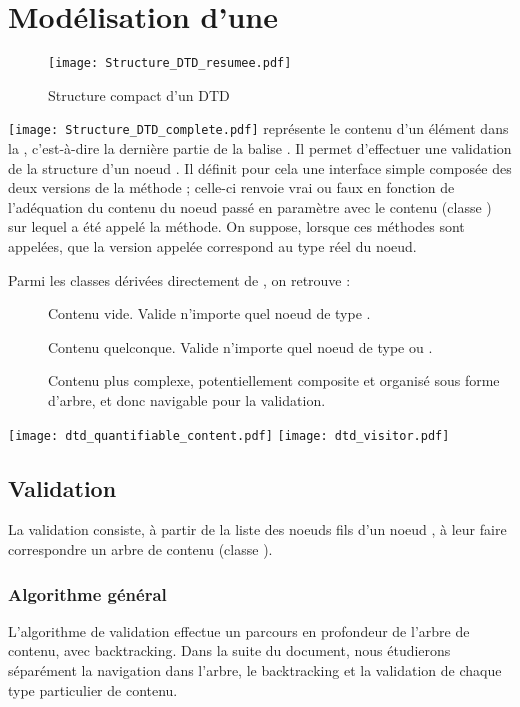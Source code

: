 \newcommand{\browseUp}{$self.browseUp(nextStep, firstNodeIterator, endNodeIterator)$\xspace}
\newcommand{\browseDown}{$self.browseDown(child, firstNodeIterator, endNodeIterator, self)$\xspace}

\section{Modélisation d'une \dtd}
\begin{figure}[H]
  \texttt{[image: Structure\_DTD\_resumee.pdf]}
  \caption{Structure compact d'un DTD}
\end{figure}
  \texttt{[image: Structure\_DTD\_complete.pdf]}
 représente le contenu d'un élément dans la \dtd, c'est-à-dire la dernière partie de la balise . Il permet d'effectuer une validation de la structure d'un noeud \xml. Il définit pour cela une interface simple composée des deux versions de la méthode  ; celle-ci renvoie vrai ou faux en fonction de l'adéquation du contenu du noeud passé en paramètre avec le contenu (classe ) sur lequel a été appelé la méthode. On suppose, lorsque ces méthodes sont appelées, que la version appelée correspond au type réel du noeud.

Parmi les classes dérivées directement de , on retrouve :
\begin{description}
\item[] Contenu vide. Valide n'importe quel noeud de type .
\item[] Contenu quelconque. Valide n'importe quel noeud de type  ou .
\item[] Contenu plus complexe, potentiellement composite et organisé sous forme d'arbre, et donc navigable pour la validation.
\end{description}

  \texttt{[image: dtd\_quantifiable\_content.pdf]}
  \texttt{[image: dtd\_visitor.pdf]}

\subsection{Validation}
La validation consiste, à partir de la liste des noeuds fils d'un noeud \xml, à leur faire correspondre un arbre de contenu (classe ).

\subsubsection{Algorithme général}
L'algorithme de validation effectue un parcours en profondeur de l'arbre de contenu, avec backtracking. Dans la suite du document, nous étudierons séparément la navigation dans l'arbre, le backtracking et la validation de chaque type particulier de contenu.

